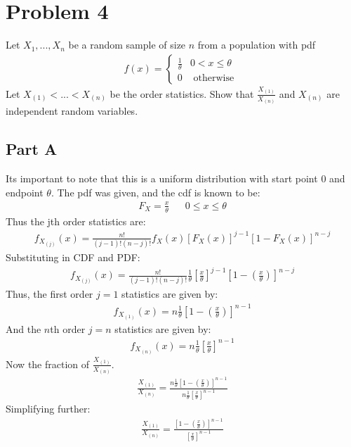 \documentclass{article}
\begin{document}
\section*{Problem 4}
 Let $X_1,...,X_n$ be a random sample of size $n$ from a population with pdf
 \begin{align*}
 f(x) = \begin{cases} 
      \frac{1}{\theta} & 0<x\leq \theta \\
       0 & \text{ otherwise } 
   \end{cases}
\end{align*}
Let $X_{(1)}<...< X_{(n)}$ be the order statistics. Show that $\frac{X_{(1)}}{X_{(n)}}$ and $X_{(n)}$ are independent
random variables.
\subsection*{Part A}
Its important to note that this is a uniform distribution with start point $0$ and endpoint $\theta$.
The pdf was given, and the cdf is known to be:
\begin{align*}
F_X = \frac{x}{\theta} && 0 \leq x \leq \theta
\end{align*}
Thus the jth order statistics are:
\begin{align*}
f_{X_{(j)}}(x) = \frac{n!}{(j-1)!(n-j)!} f_X(x) [F_X(x)]^{j-1} [1-F_X(x)]^{n-j}
\end{align*}
Substituting in CDF and PDF:
\begin{align*}
f_{X_{(j)}}(x) = \frac{n!}{(j-1)!(n-j)!} \frac{1}{\theta} [\frac{x}{\theta}]^{j-1} [1-(\frac{x}{\theta})]^{n-j}
\end{align*}
Thus, the first order $j=1$ statistics are given by:
\begin{align*}
f_{X_{(1)}}(x) = n \frac{1}{\theta} [1-(\frac{x}{\theta})]^{n-1}
\end{align*}
And the $n$th order $j=n$ statistics are given by:
\begin{align*}
f_{X_{(n)}}(x) = n \frac{1}{\theta} [\frac{x}{\theta}]^{n-1}
\end{align*}
Now the fraction of $\frac{X_{(1)}}{X_{(n)}}$.
\begin{align*}
\frac{X_{(1)}}{X_{(n)}} = \frac{n \frac{1}{\theta} [1-(\frac{x}{\theta})]^{n-1}}{n \frac{1}{\theta} [\frac{x}{\theta}]^{n-1}}
\end{align*}
Simplifying further:
\begin{align*}
\frac{X_{(1)}}{X_{(n)}} = \frac{[1-(\frac{x}{\theta})]^{n-1}}{[\frac{x}{\theta}]^{n-1}}
\end{align*}
\end{document}
